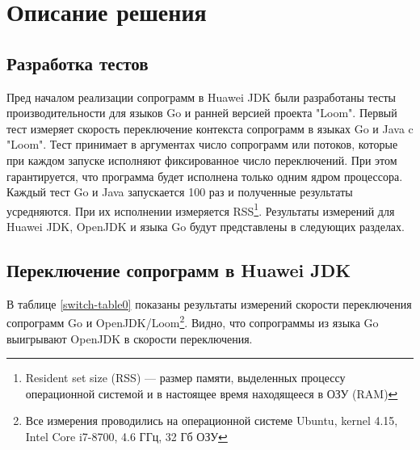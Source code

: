 \section{Описание решения}
	
	\subsection{Разработка тестов}
	Пред началом реализации сопрограмм в Huawei JDK были разработаны тесты
	производительности для языков Go и ранней версией проекта "Loom". 
	Первый тест измеряет скорость переключение контекста сопрограмм в языках Go и
	Java c "Loom". Тест принимает в аргументах число сопрограмм или потоков, которые при каждом запуске
	исполняют фиксированное число переключений. При этом гарантируется, что программа будет исполнена 
	только одним ядром процессора. Каждый тест Go и Java запускается 100 раз и полученные результаты усредняются.
	При их исполнении измеряется RSS\footnote{Resident set size (RSS) — размер памяти, 
	выделенных процессу операционной системой и в настоящее время находящееся в ОЗУ (RAM)}.
	Результаты измерений для Huawei JDK, OpenJDK и языка Go будут представлены в следующих разделах.
	\clearpage
	
	\subsection{Переключение сопрограмм в Huawei JDK}
	В таблице \ref{switch-table0} показаны результаты измерений скорости переключения сопрограмм Go и 
	OpenJDK/Loom\footnote{Все измерения проводились на операционной системе Ubuntu, kernel 4.15, Intel Core i7-8700,
	4.6 ГГц, 32 Гб ОЗУ}. Видно, что сопрограммы из языка Go выигрывают OpenJDK в скорости переключения.
	
